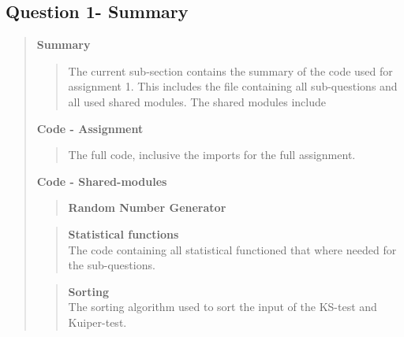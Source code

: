 
\subsection*{\textbf{Question 1- Summary}}
\begin{quote}

\textbf{Summary}
\begin{quote}
The current sub-section contains the summary of the code used for assignment 1. This includes the file  containing all sub-questions and all used shared modules. The shared modules include
\end{quote}


\textbf{Code - Assignment}

\begin{quote}
The full code, inclusive the imports for the full assignment.
\label{CODE:MAIN1}

\end{quote}

\newpage
\textbf{Code - Shared-modules} \\
\begin{quote}
\textbf{Random Number Generator}
\label{CODE:RNG}

\end{quote}

\begin{quote}
\textbf{Statistical functions} \\
The code containing all statistical functioned that where needed for the sub-questions. 

\label{CODE:Statistics}
\end{quote}


\begin{quote}
\textbf{Sorting}\\
The sorting algorithm used to sort the input of the KS-test and Kuiper-test.




\end{quote}


\end{quote}

\newpage

%

%


%
\newpage











